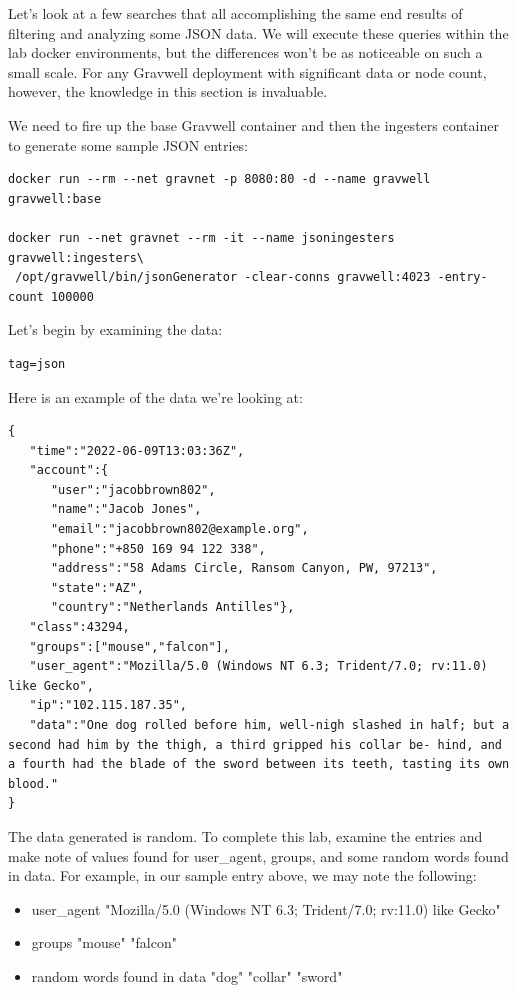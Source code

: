 Let's look at a few searches that all accomplishing the same end
results of filtering and analyzing some JSON data. We will execute these
queries within the lab docker environments, but the differences won't be
as noticeable on such a small scale. For any Gravwell deployment with
significant data or node count, however, the knowledge in this section
is invaluable.

We need to fire up the base Gravwell container and then the ingesters
container to generate some sample JSON entries:

\begin{Verbatim}[breaklines=true]
docker run --rm --net gravnet -p 8080:80 -d --name gravwell gravwell:base

docker run --net gravnet --rm -it --name jsoningesters gravwell:ingesters\
 /opt/gravwell/bin/jsonGenerator -clear-conns gravwell:4023 -entry-count 100000
\end{Verbatim}

Let's begin by examining the data:

\begin{Verbatim}
tag=json
\end{Verbatim}

Here is an example of the data we're looking at:

\begin{Verbatim}[breaklines=true]
{
   "time":"2022-06-09T13:03:36Z",
   "account":{
      "user":"jacobbrown802",
      "name":"Jacob Jones",
      "email":"jacobbrown802@example.org",
      "phone":"+850 169 94 122 338",
      "address":"58 Adams Circle, Ransom Canyon, PW, 97213",
      "state":"AZ",
      "country":"Netherlands Antilles"},
   "class":43294,
   "groups":["mouse","falcon"],
   "user_agent":"Mozilla/5.0 (Windows NT 6.3; Trident/7.0; rv:11.0) like Gecko",
   "ip":"102.115.187.35",
   "data":"One dog rolled before him, well-nigh slashed in half; but a second had him by the thigh, a third gripped his collar be- hind, and a fourth had the blade of the sword between its teeth, tasting its own blood."
}
\end{Verbatim}

The data generated is random. To complete this lab, examine the entries and make note of values found for user\_agent, groups, and some random words found in data.
For example, in our sample entry above, we may note the following:
\begin{itemize}
\item user\_agent
\subitem "Mozilla/5.0 (Windows NT 6.3; Trident/7.0; rv:11.0) like Gecko"
\item groups
\subitem "mouse"
\subitem "falcon"
\item random words found in data
\subitem "dog"
\subitem "collar"
\subitem "sword"
\end{itemize}

